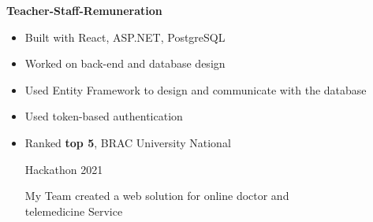 \documentclass[10pt,a4paper,ragged2e]{altacv}
\begin{document}
\begin{large}
	\textbf{Teacher-Staff-Remuneration} \href{https://github.com/nihalshahria/Teacher-Staff-remuneration}{\faExternalLink}\smallskip\smallskip
\end{large}
\begin{itemize}
	\item Built with React, ASP.NET, PostgreSQL
	\item Worked on back-end and database design
	\item Used Entity Framework to design and communicate with \newline the database
	\item Used token-based authentication
\end{itemize}\smallskip\smallskip
\smallskip

{
}
\smallskip

\begin{itemize}
	\item \begin{large}
	      Ranked \textbf{top 5}, BRAC University National \smallskip 
	              
	      Hackathon 2021\\
	\end{large}
	\smallskip
	My Team created a web solution for online doctor and \\telemedicine Service
\end{itemize}

\clearpage
\nocite{*}
\end{document}
